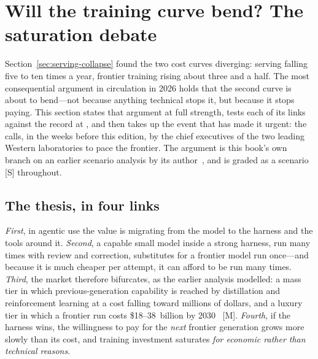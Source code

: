 \section{Will the training curve bend? The saturation debate}
\label{sec:saturation}

Section~\ref{sec:serving-collapse} found the two cost curves diverging: serving falling five to ten times a year, frontier training rising about three and a half. The most consequential argument in circulation in 2026 holds that the second curve is about to bend---not because anything technical stops it, but because it stops paying. This section states that argument at full strength, tests each of its links against the record at \datafreeze, and then takes up the event that has made it urgent: the calls, in the weeks before this edition, by the chief executives of the two leading Western laboratories to pace the frontier. The argument is this book's own branch on an earlier scenario analysis by its author~\cite{matsuoka-memory}, and is graded as a scenario [S] throughout.

\subsection{The thesis, in four links}

\emph{First}, in agentic use the value is migrating from the model to the harness and the tools around it. \emph{Second}, a capable small model inside a strong harness, run many times with review and correction, substitutes for a frontier model run once---and because it is much cheaper per attempt, it can afford to be run many times. \emph{Third}, the market therefore bifurcates, as the earlier analysis modelled: a mass tier in which previous-generation capability is reached by distillation and reinforcement learning at a cost falling toward millions of dollars, and a luxury tier in which a frontier run costs \$18--38~billion by 2030~\cite{matsuoka-memory} [M]. \emph{Fourth}, if the harness wins, the willingness to pay for the \emph{next} frontier generation grows more slowly than its cost, and training investment saturates \emph{for economic rather than technical reasons}.

